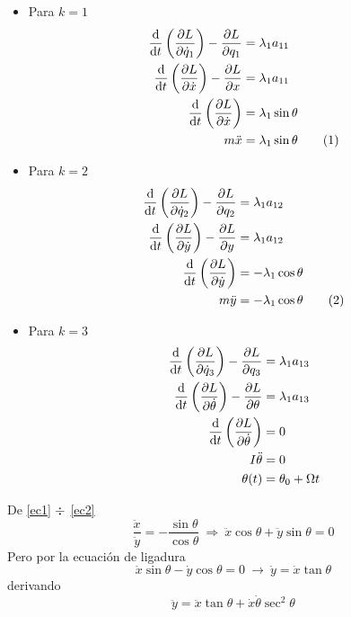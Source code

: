 \documentclass[../main]{subfiles}
\begin{document}
\begin{itemize}
    \item Para $k=1$
    \begin{align*}
        \dv{}{t}\left(\pdv{L}{\dot{q}_1}\right)-\pdv{L}{q_1}&=\lambda_1 a_{11} \\
        \dv{}{t}\left(\pdv{L}{\dot{x}}\right)-\pdv{L}{x}&=\lambda_1 a_{11}\\
        \dv{}{t}\left(\pdv{L}{\dot{x}}\right)&=\lambda_1 \sin \theta \\
        m\ddot{x}&=\lambda_1 \sin \theta \tag{$1$} \label{ec1}
    \end{align*}
    \item Para $k=2$
    \begin{align*}
        \dv{}{t}\left(\pdv{L}{\dot{q}_2}\right)-\pdv{L}{q_2}&=\lambda_1 a_{12} \\
        \dv{}{t}\left(\pdv{L}{\dot{y}}\right)-\pdv{L}{y}&=\lambda_1 a_{12}\\
        \dv{}{t}\left(\pdv{L}{\dot{y}}\right)&=-\lambda_1 \cos \theta \\
        m\ddot{y}&=-\lambda_1 \cos \theta \tag{$2$} \label{ec2}
    \end{align*}
    \item Para $k=3$
    \begin{align*}
        \dv{}{t}\left(\pdv{L}{\dot{q}_3}\right)-\pdv{L}{q_3}&=\lambda_1 a_{13} \\
        \dv{}{t}\left(\pdv{L}{\dot{\theta}}\right)-\pdv{L}{\theta}&=\lambda_1 a_{13} \\
        \dv{}{t}\left(\pdv{L}{\dot{\theta}}\right)&=0 \\
        I\ddot{\theta}&=0\\
        \theta(t)&=\theta_0+\Omega t
    \end{align*}
\end{itemize}
De \eqref{ec1} $\divisionsymbol$ \eqref{ec2}
\begin{equation*}
    \dfrac{\ddot{x}}{\ddot{y}}=-\dfrac{\sin \theta}{\cos \theta} \ \Rightarrow \ \ddot{x}\cos \theta+\ddot{y}\sin \theta=0 \tag{$3$} \label{ec3} 
\end{equation*}
Pero por la ecuación de ligadura
\begin{equation*}
    \dot{x}\sin \theta-\dot{y}\cos \theta=0 \ \rightarrow \ \dot{y}=\dot{x}\tan \theta
\end{equation*}
derivando
\begin{equation*}
    \ddot{y}=\ddot{x}\tan \theta+\dot{x}\dot{\theta}\sec^2 \theta \tag{$4$} \label{ec4}
\end{equation*}
\end{document}
